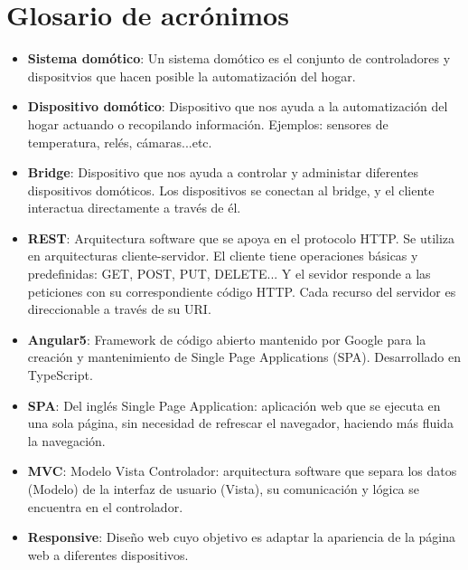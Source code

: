 \chapter*{Glosario de acrónimos}

\begin{itemize}
  
\item{\textbf{Sistema domótico}: Un sistema domótico es el conjunto de controladores y dispositvios que hacen posible la automatización del hogar.}
\item{\textbf{Dispositivo domótico}: Dispositivo que nos ayuda a la automatización del hogar actuando o recopilando información. Ejemplos: sensores de temperatura, relés, cámaras...etc. }
\item{\textbf{Bridge}: Dispositivo que nos ayuda a controlar y administar diferentes dispositivos domóticos. Los dispositivos se conectan al bridge, y el cliente interactua directamente a través de él. }
\item{\textbf{REST}: Arquitectura software que se apoya en el protocolo HTTP. Se utiliza en arquitecturas cliente-servidor. El cliente tiene operaciones básicas y predefinidas: GET, POST, PUT, DELETE... Y el sevidor responde a las peticiones con su correspondiente código HTTP.
Cada recurso del servidor es direccionable a través de su URI.}
\item{\textbf{Angular5}: Framework de código abierto mantenido por Google para la creación y mantenimiento de Single Page Applications (SPA). Desarrollado en TypeScript. }
\item{\textbf{SPA}: Del inglés Single Page Application: aplicación web que se ejecuta en una sola página, sin necesidad de refrescar el navegador, haciendo más fluida la navegación.}
\item{\textbf{MVC}: Modelo Vista Controlador: arquitectura software que separa los datos (Modelo) de la interfaz de usuario (Vista), su comunicación y lógica se encuentra en el controlador.}
\item{\textbf{Responsive}: Diseño web cuyo objetivo es adaptar la apariencia de la página web a diferentes dispositivos.}
\end{itemize}

\newpage \thispagestyle{empty} %

